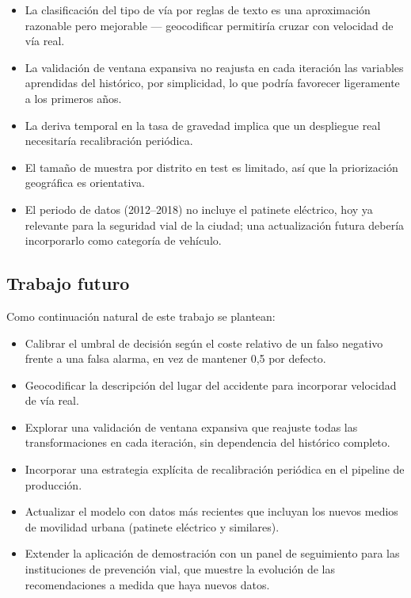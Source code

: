 \documentclass[11pt,a4paper]{article}
\begin{document}
\begin{itemize}[nosep]
\item La clasificación del tipo de vía por reglas de texto es una aproximación razonable pero mejorable --- geocodificar permitiría cruzar con velocidad de vía real.
\item La validación de ventana expansiva no reajusta en cada iteración las variables aprendidas del histórico, por simplicidad, lo que podría favorecer ligeramente a los primeros años.
\item La deriva temporal en la tasa de gravedad implica que un despliegue real necesitaría recalibración periódica.
\item El tamaño de muestra por distrito en test es limitado, así que la priorización geográfica es orientativa.
\item El periodo de datos (2012--2018) no incluye el patinete eléctrico, hoy ya relevante para la seguridad vial de la ciudad; una actualización futura debería incorporarlo como categoría de vehículo.
\end{itemize}

\subsection{Trabajo futuro}

Como continuación natural de este trabajo se plantean:

\begin{itemize}[nosep]
\item Calibrar el umbral de decisión según el coste relativo de un falso negativo frente a una falsa alarma, en vez de mantener 0,5 por defecto.
\item Geocodificar la descripción del lugar del accidente para incorporar velocidad de vía real.
\item Explorar una validación de ventana expansiva que reajuste todas las transformaciones en cada iteración, sin dependencia del histórico completo.
\item Incorporar una estrategia explícita de recalibración periódica en el pipeline de producción.
\item Actualizar el modelo con datos más recientes que incluyan los nuevos medios de movilidad urbana (patinete eléctrico y similares).
\item Extender la aplicación de demostración con un panel de seguimiento para las instituciones de prevención vial, que muestre la evolución de las recomendaciones a medida que haya nuevos datos.
\end{itemize}
\end{document}
